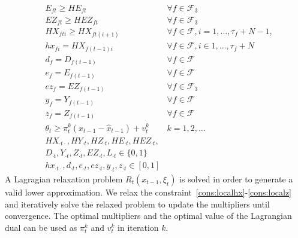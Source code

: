 \documentclass[12pt]{article}
\begin{document}
\begin{subequations}
\begin{align}
			& E_{ft} \geq HE_{ft} & \forall f \in \mathcal{F}_3 \label{cons:transEtr}\\
			& EZ_{ft} \geq HEZ_{ft} & \forall f \in \mathcal{F}_3 \label{cons:transEZtr}\\
			& HX_{fti} \geq HX_{ft(i+1)} & \forall f \in \mathcal{F}, i = 1, \dots, \tau_{f} + N -1, \label{cons:transHXtr}\\
			& hx_{fi} = HX_{f(t-1)i}& \forall f \in \mathcal{F}, i \in 1, \dots, \tau_{f} + N \label{cons:localhx} \\
			& d_{f} = D_{f(t-1)} & \forall f \in \mathcal{F} \label{cons:locald}\\
			& e_{f} = E_{f(t-1)} & \forall f \in \mathcal{F} \label{cons:locale}\\
			& ez_{f} = EZ_{f(t-1)} & \forall f \in \mathcal{F}_3 \label{cons:localez}\\
			& y_{f} = Y_{f(t-1)} & \forall f \in \mathcal{F} \label{cons:localy}\\
			& z_{f} = Z_{f(t-1)} & \forall f \in \mathcal{F} \label{cons:localz}\\
			& \theta_t \geq \pi_t^k(x_{t-1} - \hat{x}_{t-1}) + v_t^k & k = 1, 2, \dots \label{cons:cuts}\\
			& HX_{\cdot t \cdot}, HY_{\cdot t}, HZ_{\cdot t}, HE_{\cdot t}, HEZ_{\cdot t},& \nonumber\\ 
			&D_{\cdot t}, Y_{\cdot t}, Z_{\cdot t}, EZ_{\cdot t}, L_{\cdot t} \in \{0,1\}& \label{cons:binaryr}\\
			& hx_{\cdot t \cdot}, d_{\cdot t}, e_{\cdot t}, ez_{\cdot t}, y_{\cdot t}, z_{\cdot t} \in [0,1]& 
		\end{align}
	\end{subequations}
	A Lagragian relaxation problem \(R_t(x_{t-1},\xi_t)\) is solved in order to generate a valid lower approximation. We relax the constraint~\eqref{cons:localhx}-\eqref{cons:localz} and iteratively solve the relaxed problem to update the multipliers until convergence. The optimal multipliers and the optimal value of the Lagrangian dual can be used as \(\pi_t^k\) and \(v_t^k\) in iteration \(k\).
\end{document}
